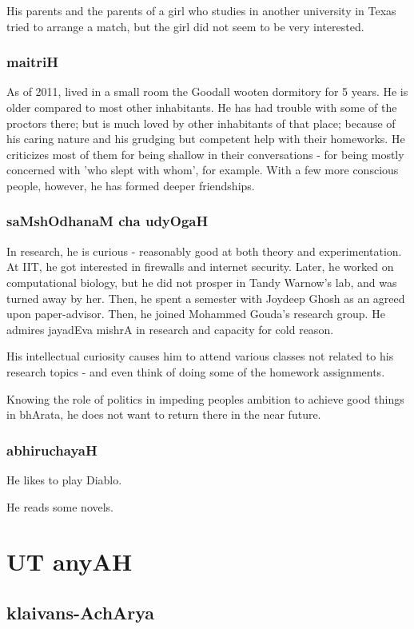 \documentclass[oneside, article]{memoir}
\begin{document}
His parents and the parents of a girl who studies in another university in Texas tried to arrange a match, but the girl did not seem to be very interested.

\section{maitriH}
As of 2011, lived in a small room the Goodall wooten dormitory for 5 years. He is older compared to most other inhabitants. He has had trouble with some of the proctors there; but is much loved by other inhabitants of that place; because of his caring nature and his grudging but competent help with their homeworks. He criticizes most of them for being shallow in their conversations - for being mostly concerned with 'who slept with whom', for example. With a few more conscious people, however, he has formed deeper friendships.

\section{saMshOdhanaM cha udyOgaH}
In research, he is curious - reasonably good at both theory and experimentation. At IIT, he got interested in firewalls and internet security. Later, he worked on computational biology, but he did not prosper in Tandy Warnow's lab, and was turned away by her. Then, he spent a semester with Joydeep Ghosh as an agreed upon paper-advisor. Then, he joined Mohammed Gouda's research group. He admires jayadEva mishrA in research and capacity for cold reason.

His intellectual curiosity causes him to attend various classes not related to his research topics - and even think of doing some of the homework assignments.

Knowing the role of politics in impeding peoples ambition to achieve good things in bhArata, he does not want to return there in the near future.

\section{abhiruchayaH}
He likes to play Diablo.

He reads some novels.

\part{UT anyAH}
\chapter{klaivans-AchArya}
\end{document}
